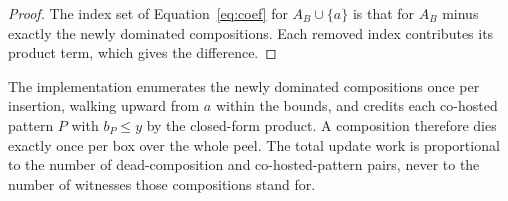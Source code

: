 \begin{proof}
The index set of Equation~\eqref{eq:coef} for $A_B\cup\{a\}$ is that for $A_B$ minus exactly the newly dominated compositions.
%
Each removed index contributes its product term, which gives the difference.
\end{proof}

The implementation enumerates the newly dominated compositions once per insertion, walking upward from $a$ within the bounds, and credits each co-hosted pattern $P$ with $b_P\le y$ by the closed-form product.
%
A composition therefore dies exactly once per box over the whole peel.
%
The total update work is proportional to the number of dead-composition and co-hosted-pattern pairs, never to the number of witnesses those compositions stand for.
